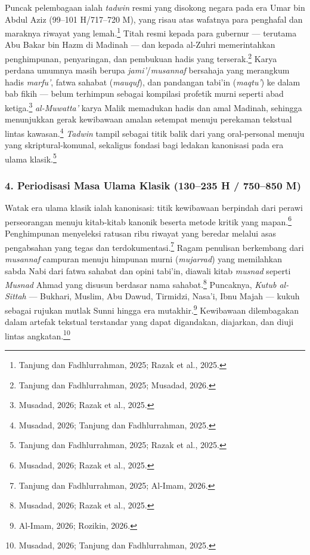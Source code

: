 Puncak pelembagaan ialah \textit{tadwin} resmi yang disokong negara pada era Umar bin Abdul Aziz (99--101 H/717--720 M), yang risau atas wafatnya para penghafal dan maraknya riwayat yang lemah.\footnote{Tanjung dan Fadhlurrahman, 2025; Razak et al., 2025.} Titah resmi kepada para gubernur --- terutama Abu Bakar bin Hazm di Madinah --- dan kepada al-Zuhri memerintahkan penghimpunan, penyaringan, dan pembukuan hadis yang terserak.\footnote{Tanjung dan Fadhlurrahman, 2025; Musadad, 2026.} Karya perdana umumnya masih berupa \textit{jami'}/\textit{musannaf} bersahaja yang merangkum hadis \textit{marfu'}, fatwa sahabat (\textit{mauquf}), dan pandangan tabi'in (\textit{maqtu'}) ke dalam bab fikih --- belum terhimpun sebagai kompilasi profetik murni seperti abad ketiga.\footnote{Musadad, 2026; Razak et al., 2025.} \textit{al-Muwatta'} karya Malik memadukan hadis dan amal Madinah, sehingga menunjukkan gerak kewibawaan amalan setempat menuju perekaman tekstual lintas kawasan.\footnote{Musadad, 2026; Tanjung dan Fadhlurrahman, 2025.} \textit{Tadwin} tampil sebagai titik balik dari yang oral-personal menuju yang skriptural-komunal, sekaligus fondasi bagi ledakan kanonisasi pada era ulama klasik.\footnote{Tanjung dan Fadhlurrahman, 2025; Razak et al., 2025.}

\subsubsection*{4. Periodisasi Masa Ulama Klasik (130--235 H / 750--850 M)}

Watak era ulama klasik ialah kanonisasi: titik kewibawaan berpindah dari perawi perseorangan menuju kitab-kitab kanonik beserta metode kritik yang mapan.\footnote{Musadad, 2026; Razak et al., 2025.} Penghimpunan menyeleksi ratusan ribu riwayat yang beredar melalui asas pengabsahan yang tegas dan terdokumentasi.\footnote{Tanjung dan Fadhlurrahman, 2025; Al-Imam, 2026.} Ragam penulisan berkembang dari \textit{musannaf} campuran menuju himpunan murni (\textit{mujarrad}) yang memilahkan sabda Nabi dari fatwa sahabat dan opini tabi'in, diawali kitab \textit{musnad} seperti \textit{Musnad} Ahmad yang disusun berdasar nama sahabat.\footnote{Musadad, 2026; Razak et al., 2025.} Puncaknya, \textit{Kutub al-Sittah} --- Bukhari, Muslim, Abu Dawud, Tirmidzi, Nasa'i, Ibnu Majah --- kukuh sebagai rujukan mutlak Sunni hingga era mutakhir.\footnote{Al-Imam, 2026; Rozikin, 2026.} Kewibawaan dilembagakan dalam artefak tekstual terstandar yang dapat digandakan, diajarkan, dan diuji lintas angkatan.\footnote{Musadad, 2026; Tanjung dan Fadhlurrahman, 2025.}


